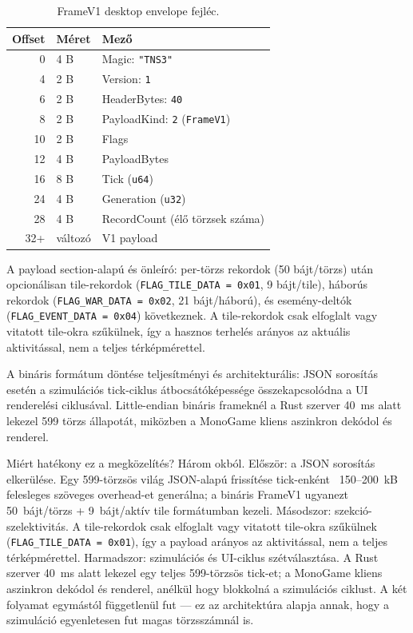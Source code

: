 ﻿\documentclass[a4paper,12pt]{report}
\begin{document}
\begin{table}[h]
\centering
\caption{FrameV1 desktop envelope fejléc.}
\label{tab:framev1-envelope}
\begin{tabular}{rll}
\hline
\textbf{Offset} & \textbf{Méret} & \textbf{Mező} \\
\hline
0  & 4 B & Magic: \texttt{"TNS3"} \\
4  & 2 B & Version: \texttt{1} \\
6  & 2 B & HeaderBytes: \texttt{40} \\
8  & 2 B & PayloadKind: \texttt{2} (\texttt{FrameV1}) \\
10 & 2 B & Flags \\
12 & 4 B & PayloadBytes \\
16 & 8 B & Tick (\texttt{u64}) \\
24 & 4 B & Generation (\texttt{u32}) \\
28 & 4 B & RecordCount (élő törzsek száma) \\
32+ & változó & V1 payload \\
\hline
\end{tabular}
\end{table}

A payload section-alapú és önleíró: per-törzs rekordok (50 bájt/törzs)
után opcionálisan tile-rekordok (\texttt{FLAG\_TILE\_DATA = 0x01}, 9 bájt/tile),
háborús rekordok (\texttt{FLAG\_WAR\_DATA = 0x02}, 21 bájt/háború),
és esemény-deltók (\texttt{FLAG\_EVENT\_DATA = 0x04}) következnek.
A tile-rekordok csak elfoglalt vagy vitatott tile-okra szűkülnek,
így a hasznos terhelés arányos az aktuális aktivitással, nem a teljes térképmérettel.

A bináris formátum döntése teljesítményi és architekturális: JSON sorosítás esetén
a szimulációs tick-ciklus átbocsátóképessége összekapcsolódna a UI renderelési
ciklusával. Little-endian bináris frameknél a Rust szerver 40~ms alatt
lekezel 599 törzs állapotát, miközben a MonoGame kliens aszinkron dekódol és renderel.

Miért hatékony ez a megközelítés? Három okból. Először: a JSON sorosítás elkerülése.
Egy 599-törzsös világ JSON-alapú frissítése tick-enként ~150--200~kB felesleges szöveges
overhead-et generálna; a bináris FrameV1 ugyanezt 50~bájt/törzs + 9~bájt/aktív tile
formátumban kezeli. Másodszor: szekció-szelektivitás. A tile-rekordok csak elfoglalt
vagy vitatott tile-okra szűkülnek (\texttt{FLAG\_TILE\_DATA = 0x01}), így a payload
arányos az aktivitással, nem a teljes térképmérettel. Harmadszor: szimulációs és
UI-ciklus szétválasztása. A Rust szerver 40~ms alatt lekezel egy teljes 599-törzsös
tick-et; a MonoGame kliens aszinkron dekódol és renderel, anélkül hogy blokkolná a
szimulációs ciklust. A két folyamat egymástól függetlenül fut --- ez az architektúra
alapja annak, hogy a szimuláció egyenletesen fut magas törzsszámnál is.
\end{document}
